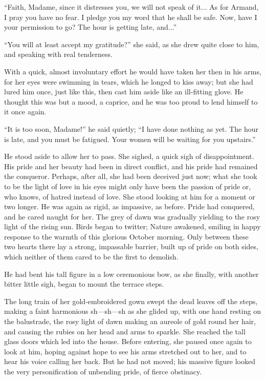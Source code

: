 \enquote{Faith, Madame, since it distresses you, we will not speak of it... As for Armand, I pray you have no fear. I pledge you my word that he shall be safe. Now, have I your permission to go? The hour is getting late, and...}

\enquote{You will at least accept my gratitude?} she said, as she drew quite close to him, and speaking with real tenderness.

With a quick, almost involuntary effort he would have taken her then in his arms, for her eyes were swimming in tears, which he longed to kiss away; but she had lured him once, just like this, then cast him aside like an ill-fitting glove. He thought this was but a mood, a caprice, and he was too proud to lend himself to it once again.

\enquote{It is too soon, Madame!} he said quietly; \enquote{I have done nothing as yet. The hour is late, and you must be fatigued. Your women will be waiting for you upstairs.}

He stood aside to allow her to pass. She sighed, a quick sigh of disappointment. His pride and her beauty had been in direct conflict, and his pride had remained the conqueror. Perhaps, after all, she had been deceived just now; what she took to be the light of love in his eyes might only have been the passion of pride or, who knows, of hatred instead of love. She stood looking at him for a moment or two longer. He was again as rigid, as impassive, as before. Pride had conquered, and he cared naught for her. The grey of dawn was gradually yielding to the rosy light of the rising sun. Birds began to twitter; Nature awakened, smiling in happy response to the warmth of this glorious October morning. Only between these two hearts there lay a strong, impassable barrier, built up of pride on both sides, which neither of them cared to be the first to demolish.

He had bent his tall figure in a low ceremonious bow, as she finally, with another bitter little sigh, began to mount the terrace steps.

The long train of her gold-embroidered gown swept the dead leaves off the steps, making a faint harmonious sh---sh---sh as she glided up, with one hand resting on the balustrade, the rosy light of dawn making an aureole of gold round her hair, and causing the rubies on her head and arms to sparkle. She reached the tall glass doors which led into the house. Before entering, she paused once again to look at him, hoping against hope to see his arms stretched out to her, and to hear his voice calling her back. But he had not moved; his massive figure looked the very personification of unbending pride, of fierce obstinacy.

